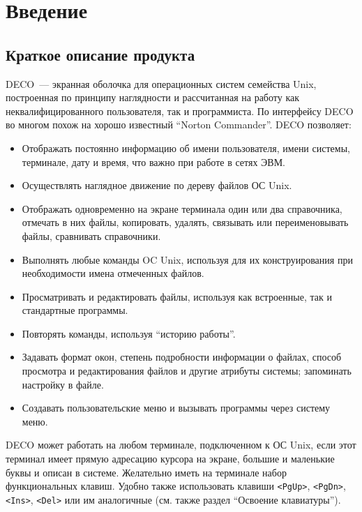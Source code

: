 


\section{Введение}

\subsection{Краткое описание продукта}

DECO~--- экранная оболочка для операционных систем семейства Unix,
построенная по принципу наглядности и рассчитанная на
работу как неквалифицированного пользователя, так и программиста.
По интерфейсу DECO во многом похож на хорошо известный ``Norton Commander''.
DECO позволяет:

\begin{itemize}
\item
Отображать постоянно информацию об имени пользователя, имени системы,
терминале, дату и время, что важно при работе в сетях ЭВМ.
\item
Осуществлять наглядное движение по дереву файлов ОС Unix.
\item
Отображать одновременно на экране терминала один или два справочника,
отмечать в них файлы, копировать, удалять, связывать или переименовывать
файлы, сравнивать справочники.
\item
Выполнять любые команды OC Unix, используя для их конструирования при
необходимости имена отмеченных файлов.
\item
Просматривать и редактировать файлы, используя как встроенные, так и
стандартные программы.
\item
Повторять команды, используя ``историю работы''.
\item
Задавать формат окон, степень подробности информации о файлах,
способ просмотра и редактирования файлов и другие атрибуты системы;
запоминать настройку в файле.
\item
Создавать пользовательские меню и вызывать программы через систему
меню.
\end{itemize}

DECO может работать на любом терминале, подключенном к ОС Unix,
если этот терминал имеет прямую адресацию курсора на экране, большие и
маленькие буквы и описан в системе. Желательно иметь на терминале набор
функциональных клавиш. Удобно также использовать клавиши
{\tt <PgUp>}, {\tt <PgDn>}, {\tt <Ins>}, {\tt <Del>}
или им аналогичные (см. также раздел ``Освоение клавиатуры'').

